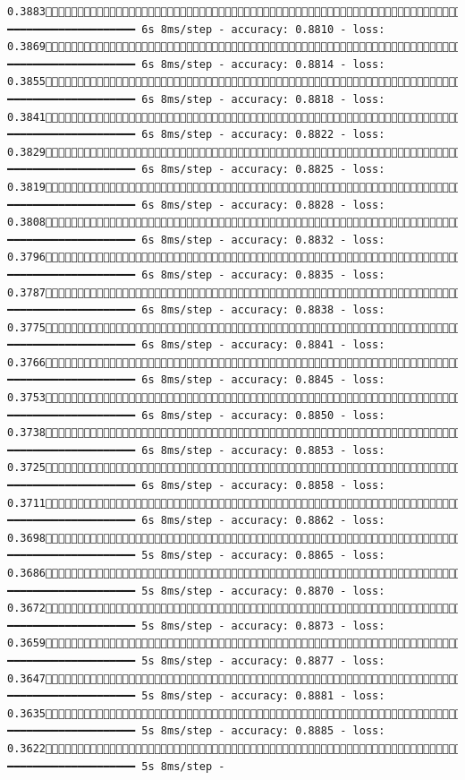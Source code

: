\documentclass[
  letterpaper,
  DIV=11,
  numbers=noendperiod]{scrreprt}
\begin{document}
\begin{verbatim}
0.38831029/1875 ━━━━━━━━━━━━━━━━━━━━ 6s 8ms/step - accuracy: 0.8810 - loss: 0.38691036/1875 ━━━━━━━━━━━━━━━━━━━━ 6s 8ms/step - accuracy: 0.8814 - loss: 0.38551043/1875 ━━━━━━━━━━━━━━━━━━━━ 6s 8ms/step - accuracy: 0.8818 - loss: 0.38411049/1875 ━━━━━━━━━━━━━━━━━━━━ 6s 8ms/step - accuracy: 0.8822 - loss: 0.38291054/1875 ━━━━━━━━━━━━━━━━━━━━ 6s 8ms/step - accuracy: 0.8825 - loss: 0.38191060/1875 ━━━━━━━━━━━━━━━━━━━━ 6s 8ms/step - accuracy: 0.8828 - loss: 0.38081066/1875 ━━━━━━━━━━━━━━━━━━━━ 6s 8ms/step - accuracy: 0.8832 - loss: 0.37961071/1875 ━━━━━━━━━━━━━━━━━━━━ 6s 8ms/step - accuracy: 0.8835 - loss: 0.37871077/1875 ━━━━━━━━━━━━━━━━━━━━ 6s 8ms/step - accuracy: 0.8838 - loss: 0.37751082/1875 ━━━━━━━━━━━━━━━━━━━━ 6s 8ms/step - accuracy: 0.8841 - loss: 0.37661089/1875 ━━━━━━━━━━━━━━━━━━━━ 6s 8ms/step - accuracy: 0.8845 - loss: 0.37531097/1875 ━━━━━━━━━━━━━━━━━━━━ 6s 8ms/step - accuracy: 0.8850 - loss: 0.37381104/1875 ━━━━━━━━━━━━━━━━━━━━ 6s 8ms/step - accuracy: 0.8853 - loss: 0.37251112/1875 ━━━━━━━━━━━━━━━━━━━━ 6s 8ms/step - accuracy: 0.8858 - loss: 0.37111119/1875 ━━━━━━━━━━━━━━━━━━━━ 6s 8ms/step - accuracy: 0.8862 - loss: 0.36981126/1875 ━━━━━━━━━━━━━━━━━━━━ 5s 8ms/step - accuracy: 0.8865 - loss: 0.36861134/1875 ━━━━━━━━━━━━━━━━━━━━ 5s 8ms/step - accuracy: 0.8870 - loss: 0.36721141/1875 ━━━━━━━━━━━━━━━━━━━━ 5s 8ms/step - accuracy: 0.8873 - loss: 0.36591148/1875 ━━━━━━━━━━━━━━━━━━━━ 5s 8ms/step - accuracy: 0.8877 - loss: 0.36471155/1875 ━━━━━━━━━━━━━━━━━━━━ 5s 8ms/step - accuracy: 0.8881 - loss: 0.36351163/1875 ━━━━━━━━━━━━━━━━━━━━ 5s 8ms/step - accuracy: 0.8885 - loss: 0.36221170/1875 ━━━━━━━━━━━━━━━━━━━━ 5s 8ms/step - 
\end{verbatim}
\end{document}
